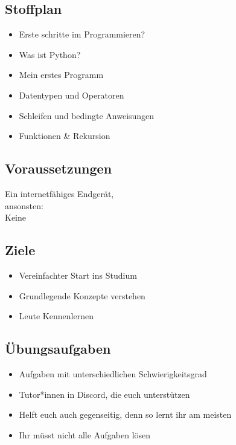 \subsection{Stoffplan}
\begin{frame}
	\slidehead
	\begin{itemize}
		\item Erste schritte im Programmieren?
		\item Was ist Python?
		\item Mein erstes Programm
		\item Datentypen und Operatoren
		\item Schleifen und bedingte Anweisungen
		\item Funktionen \& Rekursion
	\end{itemize}
\end{frame}

\subsection{Voraussetzungen}
\begin{frame}
	\slidehead
	\centering
	\vspace{1.5cm}
	\tiny Ein internetfähiges Endgerät,\\ansonsten:\\
	\Huge Keine
\end{frame}

\subsection{Ziele}
\begin{frame}
	\slidehead
	\begin{itemize}
		\item Vereinfachter Start ins Studium
		\item Grundlegende Konzepte verstehen
		\item Leute Kennenlernen

	\end{itemize}
\end{frame}

\subsection{Übungsaufgaben}
\begin{frame}
	\slidehead
	\begin{itemize}
		\item Aufgaben mit unterschiedlichen Schwierigkeitsgrad
		\item Tutor*innen in Discord, die euch unterstützen
		\item Helft euch auch gegenseitig, denn so lernt ihr am meisten
		\item Ihr müsst nicht alle Aufgaben lösen
	\end{itemize}
\end{frame}

